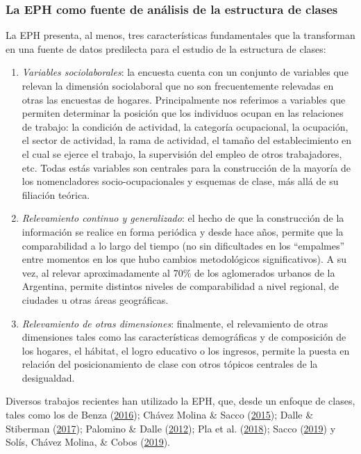 \documentclass[
]{article}
\begin{document}
\hypertarget{la-eph-como-fuente-de-anuxe1lisis-de-la-estructura-de-clases}{%
\subsubsection{La EPH como fuente de análisis de la estructura de clases}\label{la-eph-como-fuente-de-anuxe1lisis-de-la-estructura-de-clases}}

La EPH presenta, al menos, tres características fundamentales que la transforman en una fuente de datos predilecta para el estudio de la estructura de clases:

\begin{enumerate}
\def\labelenumi{\arabic{enumi}.}
\item
  \emph{Variables sociolaborales}: la encuesta cuenta con un conjunto de variables que relevan la dimensión sociolaboral que no son frecuentemente relevadas en otras las encuestas de hogares. Principalmente nos referimos a variables que permiten determinar la posición que los individuos ocupan en las relaciones de trabajo: la condición de actividad, la categoría ocupacional, la ocupación, el sector de actividad, la rama de actividad, el tamaño del establecimiento en el cual se ejerce el trabajo, la supervisión del empleo de otros trabajadores, etc. Todas estás variables son centrales para la construcción de la mayoría de los nomencladores socio-ocupacionales y esquemas de clase, más allá de su filiación teórica.
\item
  \emph{Relevamiento continuo y generalizado}: el hecho de que la construcción de la información se realice en forma periódica y desde hace años, permite que la comparabilidad a lo largo del tiempo (no sin dificultades en los ``empalmes'' entre momentos en los que hubo cambios metodológicos significativos). A su vez, al relevar aproximadamente al 70\% de los aglomerados urbanos de la Argentina, permite distintos niveles de comparabilidad a nivel regional, de ciudades u otras áreas geográficas.
\item
  \emph{Relevamiento de otras dimensiones}: finalmente, el relevamiento de otras dimensiones tales como las características demográficas y de composición de los hogares, el hábitat, el logro educativo o los ingresos, permite la puesta en relación del posicionamiento de clase con otros tópicos centrales de la desigualdad.
\end{enumerate}

Diversos trabajos recientes han utilizado la EPH, que, desde un enfoque de clases, tales como los de Benza (\protect\hyperlink{ref-Benza2016}{2016}); Chávez Molina \& Sacco (\protect\hyperlink{ref-ChavezMolina2015}{2015}); Dalle \& Stiberman (\protect\hyperlink{ref-Dalle.Stiberman2017}{2017}); Palomino \& Dalle (\protect\hyperlink{ref-Palomino.Dalle2012}{2012}); Pla et al. (\protect\hyperlink{ref-Pla.etal2018}{2018}); Sacco (\protect\hyperlink{ref-Sacco2019}{2019}) y Solís, Chávez Molina, \& Cobos (\protect\hyperlink{ref-Solis.etal2019}{2019}).
\end{document}
